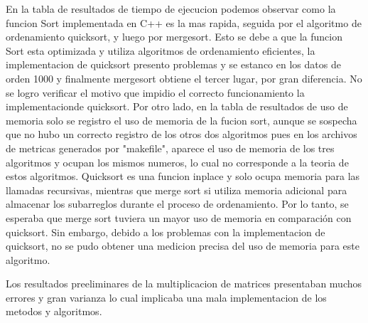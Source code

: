 En la tabla de resultados de tiempo de ejecucion podemos observar como la funcion Sort implementada en C++ es la mas rapida, seguida por el algoritmo de ordenamiento quicksort, y luego por mergesort. Esto se debe a que la funcion Sort esta optimizada y utiliza algoritmos de ordenamiento eficientes, la implementacion de quicksort presento problemas y se estanco en los datos de orden 1000 y finalmente mergesort obtiene el tercer lugar, por gran diferencia. No se logro verificar el motivo que impidio el correcto funcionamiento la implementacionde quicksort.
Por otro lado, en la tabla de resultados de uso de memoria solo se registro el uso de memoria de la fucion sort, aunque se sospecha que no hubo un correcto registro de los otros dos algoritmos pues en los archivos de metricas generados por "makefile", aparece el uso de memoria de los tres algoritmos y ocupan los mismos numeros, lo cual no corresponde a la teoria de estos algoritmos. Quicksort es una funcion inplace y solo ocupa memoria para las llamadas recursivas, mientras que merge sort si utiliza memoria adicional para almacenar los subarreglos durante el proceso de ordenamiento. Por lo tanto, se esperaba que merge sort tuviera un mayor uso de memoria en comparación con quicksort. Sin embargo, debido a los problemas con la implementacion de quicksort, no se pudo obtener una medicion precisa del uso de memoria para este algoritmo.

Los resultados preeliminares de la multiplicacion de matrices presentaban muchos errores y gran varianza lo cual implicaba una mala implementacion de los metodos y algoritmos. 